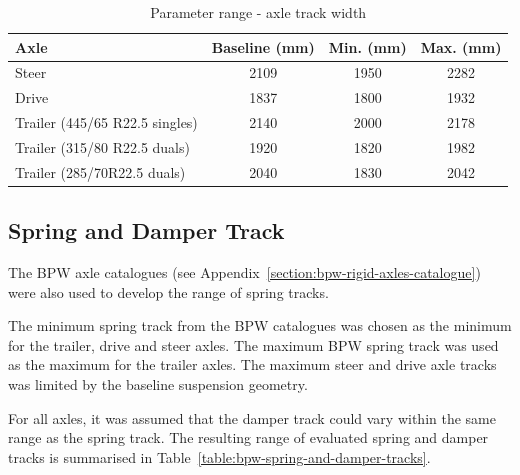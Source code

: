 \begin{table}[H]
	\centering\footnotesize
	\begin{threeparttable}

		\begin{tabulary}{\textwidth}{lccc}
			\toprule
             \textbf{Axle} & \textbf{Baseline (mm)} & \textbf{Min. (mm)} & \textbf{Max. (mm)} \\
			\midrule
             Steer & 2109  & 1950  & 2282 \\
             Drive & 1837  & 1800  & 1932 \\
             Trailer (445/65 R22.5 singles)  & 2140  & 2000  & 2178 \\
             Trailer (315/80 R22.5 duals) & 1920  & 1820  & 1982 \\
             Trailer (285/70R22.5 duals) & 2040  & 1830  & 2042 \\
			\bottomrule
		\end{tabulary}

		\caption{Parameter range - axle track width}
		\label{table:parameter-range-axle-track}


	\end{threeparttable}
\end{table}

\subsection{Spring and Damper Track}\label{section:spring and damper track}

The BPW axle catalogues \cite{BPW2010} (see Appendix~\ref{section:bpw-rigid-axles-catalogue}) were also used to develop the range of spring tracks. 

The minimum spring track from the BPW catalogues was chosen as the minimum for the trailer, drive and steer axles. The maximum BPW spring track was used as the maximum for the trailer axles. The maximum steer and drive axle tracks was limited by the baseline suspension geometry.

For all axles, it was assumed that the damper track could vary within the same range as the spring track. The resulting range of evaluated spring and damper tracks is summarised in Table~\ref{table:bpw-spring-and-damper-tracks}.

